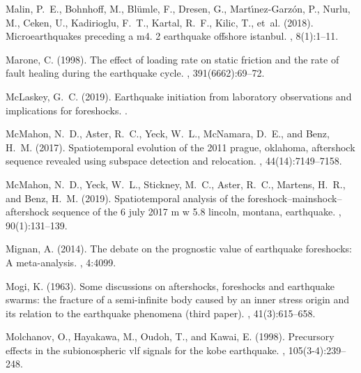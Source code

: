 \documentclass[a4paper,12pt,twoside]{article}
\begin{document}
\begin{thebibliography}{}
Malin, P.~E., Bohnhoff, M., Bl{\"u}mle, F., Dresen, G.,
  Mart{\'\i}nez-Garz{\'o}n, P., Nurlu, M., Ceken, U., Kadirioglu, F.~T.,
  Kartal, R.~F., Kilic, T., et~al. (2018).
\newblock Microearthquakes preceding a m4. 2 earthquake offshore istanbul.
, 8(1):1--11.

Marone, C. (1998).
\newblock The effect of loading rate on static friction and the rate of fault
  healing during the earthquake cycle.
, 391(6662):69--72.

McLaskey, G.~C. (2019).
\newblock Earthquake initiation from laboratory observations and implications
  for foreshocks.
.

McMahon, N.~D., Aster, R.~C., Yeck, W.~L., McNamara, D.~E., and Benz, H.~M.
  (2017).
\newblock Spatiotemporal evolution of the 2011 prague, oklahoma, aftershock
  sequence revealed using subspace detection and relocation.
, 44(14):7149--7158.

McMahon, N.~D., Yeck, W.~L., Stickney, M.~C., Aster, R.~C., Martens, H.~R., and
  Benz, H.~M. (2019).
\newblock Spatiotemporal analysis of the foreshock--mainshock--aftershock
  sequence of the 6 july 2017 m w 5.8 lincoln, montana, earthquake.
, 90(1):131--139.

Mignan, A. (2014).
\newblock The debate on the prognostic value of earthquake foreshocks: A
  meta-analysis.
, 4:4099.

Mogi, K. (1963).
\newblock Some discussions on aftershocks, foreshocks and earthquake swarms:
  the fracture of a semi-infinite body caused by an inner stress origin and its
  relation to the earthquake phenomena (third paper).
, 41(3):615--658.

Molchanov, O., Hayakawa, M., Oudoh, T., and Kawai, E. (1998).
\newblock Precursory effects in the subionospheric vlf signals for the kobe
  earthquake.
,
  105(3-4):239--248.
  

\end{thebibliography}
\end{document}
